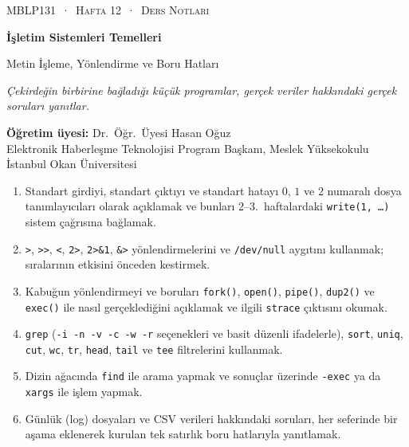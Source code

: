 \documentclass[11pt,a4paper]{article}
\newcommand{\cmd}[1]{\texttt{#1}}
\begin{document}
\setlength{\emergencystretch}{3em}
\thispagestyle{empty}
\begin{tcolorbox}[enhanced,colback=dark,colframe=dark,arc=0pt,boxrule=0pt,
  left=18pt,right=18pt,top=20pt,bottom=20pt,coltext=white]
{\small\color{mint}\textsc{MBLP131 \,·\, Hafta 12 \,·\, Ders Notları}}\par\medskip
{\headfont\fontsize{26}{30}\selectfont\bfseries İşletim Sistemleri Temelleri}\par\medskip
{\large Metin İşleme, Yönlendirme ve Boru Hatları}\par\smallskip
{\small\itshape\color{white!70} Çekirdeğin birbirine bağladığı küçük programlar, gerçek veriler hakkındaki gerçek soruları yanıtlar.}
\end{tcolorbox}

\vspace{0.4em}
\begin{minipage}[t]{0.70\linewidth}
\small
\textbf{Öğretim üyesi:} Dr.\ Öğr.\ Üyesi Hasan Oğuz\\
Elektronik Haberleşme Teknolojisi Program Başkanı, Meslek Yüksekokulu\\
İstanbul Okan Üniversitesi
\end{minipage}

\vspace{0.8em}
\begin{keyidea}
\begin{enumerate}[leftmargin=1.4em]
  \item Standart girdiyi, standart çıktıyı ve standart hatayı $0$, $1$ ve $2$ numaralı dosya tanımlayıcıları olarak açıklamak ve bunları 2--3.~haftalardaki \cmd{write(1, \dots)} sistem çağrısına bağlamak.
  \item \cmd{>}, \cmd{>>}, \cmd{<}, \cmd{2>}, \cmd{2>\&1}, \cmd{\&>} yönlendirmelerini ve \cmd{/dev/null} aygıtını kullanmak; sıralarının etkisini önceden kestirmek.
  \item Kabuğun yönlendirmeyi ve boruları \cmd{fork()}, \cmd{open()}, \cmd{pipe()}, \cmd{dup2()} ve \cmd{exec()} ile nasıl gerçeklediğini açıklamak ve ilgili \cmd{strace} çıktısını okumak.
  \item \cmd{grep} (\cmd{-i -n -v -c -w -r} seçenekleri ve basit düzenli ifadelerle), \cmd{sort}, \cmd{uniq}, \cmd{cut}, \cmd{wc}, \cmd{tr}, \cmd{head}, \cmd{tail} ve \cmd{tee} filtrelerini kullanmak.
  \item Dizin ağacında \cmd{find} ile arama yapmak ve sonuçlar üzerinde \cmd{-exec} ya da \cmd{xargs} ile işlem yapmak.
  \item Günlük (log) dosyaları ve CSV verileri hakkındaki soruları, her seferinde bir aşama eklenerek kurulan tek satırlık boru hatlarıyla yanıtlamak.
\end{enumerate}
\end{keyidea}
\end{document}
